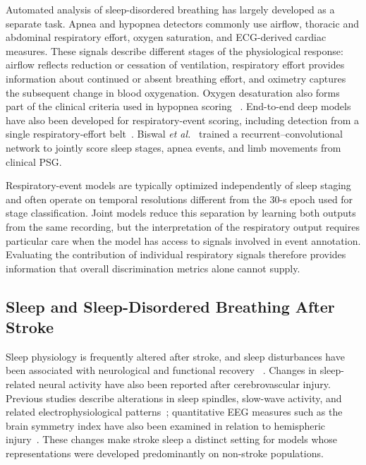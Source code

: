 \documentclass[a4paper,fleqn]{cas-sc}
\begin{document}
Automated analysis of sleep-disordered breathing has largely developed as a
separate task. Apnea and hypopnea detectors commonly use airflow, thoracic and
abdominal respiratory effort, oxygen saturation, and ECG-derived cardiac
measures. These signals describe different stages of the physiological response:
airflow reflects reduction or cessation of ventilation, respiratory effort
provides information about continued or absent breathing effort, and oximetry
captures the subsequent change in blood oxygenation. Oxygen desaturation also
forms part of the clinical criteria used in hypopnea scoring
~\cite{aasm2023manual}. End-to-end deep models have also been developed for
respiratory-event scoring, including detection from a single respiratory-effort
belt~\cite{nassi2022effortbelt}. Biswal \emph{et al.}~\cite{biswal2018expert}
trained a recurrent--convolutional network to jointly score sleep stages, apnea
events, and limb movements from clinical PSG.

Respiratory-event models are typically optimized independently of sleep
staging and often operate on temporal resolutions different from the 30-s epoch
used for stage classification. Joint models reduce this separation by learning
both outputs from the same recording, but the interpretation of the respiratory
output requires particular care when the model has access to signals involved
in event annotation. Evaluating the contribution of individual respiratory
signals therefore provides information that overall discrimination metrics
alone cannot supply.

\subsection{Sleep and Sleep-Disordered Breathing After Stroke}

Sleep physiology is frequently altered after stroke, and sleep disturbances
have been associated with neurological and functional recovery
~\cite{bassetti2006sleep,denis2024sleep,tellenbach2023brainstem}. Changes in
sleep-related neural activity have also been reported after cerebrovascular
injury. Previous studies describe alterations in sleep spindles, slow-wave activity, and related electrophysiological patterns~\cite{gottselig2002stroke,fernandez2019spindles,simpson2023laterality,facchin2020slowwaves,zheng2025spindles}; quantitative EEG measures such as the brain symmetry index have also been examined in relation to hemispheric injury~\cite{anastasi2017bsi}. These changes make
stroke sleep a distinct setting for models whose representations were
developed predominantly on non-stroke populations.
\end{document}
